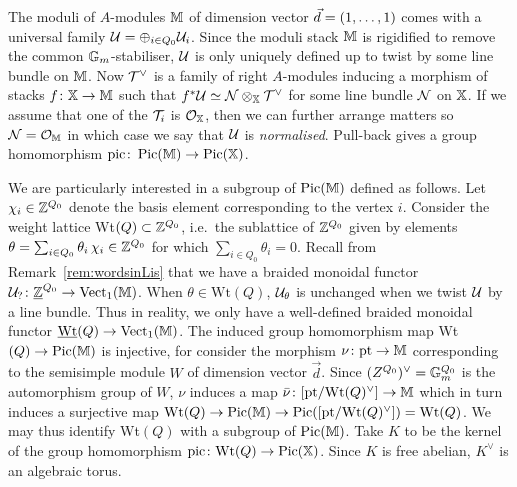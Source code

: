\documentclass[12pt]{amsart}
\begin{document}
The moduli of $A$-modules $\mathbb{M}$ of dimension vector ${\vec{d}} = (1, \ldots, 1)$ comes with a universal family $\mathcal{U}  = \oplus_{i \in Q_0} \mathcal{U}_i$. Since the moduli stack $\mathbb{M}$ is rigidified to remove the common $\mathbb{G}_m$-stabiliser, $\mathcal{U}$ is only uniquely defined up to twist by some line bundle on $\mathbb{M}$. 
Now $\mathcal{T}^{\vee}$ is a family of right $A$-modules inducing a morphism of stacks $f \colon \mathbb{X} \rightarrow \mathbb{M}$ such that $f^* \mathcal{U} \simeq \mathcal{N} \otimes_{\mathbb{X}} \mathcal{T}^{\vee}$ for some line bundle $\mathcal{N}$ on $\mathbb{X}$. If we assume that one of the $\mathcal{T}_i$ is $\mathcal{O}_{\mathbb{X}}$, then we can further arrange matters so $\mathcal{N} = \mathcal{O}_{\mathbb{M}}$ in which case we say that $\mathcal{U}$ is {\em normalised}. Pull-back gives a group homomorphism $\text{pic} \colon \operatorname{Pic}(\mathbb{M}) \rightarrow \operatorname{Pic}(\mathbb{X})$. 




We are particularly interested in a subgroup of $\operatorname{Pic}(\mathbb{M})$ defined as follows. Let $\chi_i \in \mathbb{Z}^{Q_0}$ denote the basis element corresponding to the vertex $i$. Consider the weight lattice Wt$(Q) \subset \mathbb{Z}^{Q_0}$, i.e.\ the sublattice of $\mathbb{Z}^{Q_0}$ given by elements $\theta = \sum_{i\in Q_0} \theta_i \,\chi_i \in \mathbb{Z}^{Q_0}$ for which $\sum_{i \in Q_0} \theta_i = 0$. Recall from Remark~\ref{rem:wordsinLis} that we have a braided monoidal functor  $\mathcal{U}_? \colon  \underline{\mathbb{Z}}^{Q_0} \to \operatorname{Vect}_1(\mathbb{M})$. When $\theta \in \text{Wt}(Q)$, $\mathcal{U}_{\theta}$ is  unchanged when we twist $\mathcal{U}$ by a line bundle. Thus in reality, we only have a well-defined braided monoidal functor $\underline{\text{Wt}}(Q) \to \operatorname{Vect}_1(\mathbb{M})$. 
The induced group homomorphism map Wt$(Q) \to \operatorname{Pic}(\mathbb{M})$ is injective, for consider the morphism $\nu \colon \text{pt} \rightarrow \mathbb{M}$ corresponding to the semisimple module $W$ of dimension vector $\vec{d}$. Since $(Z^{Q_0})^{\vee} = \mathbb{G}_m^{Q_0}$ is the automorphism group of $W$, $\nu$ induces a map $\bar{\nu} \colon [\text{pt}/\text{Wt}(Q)^{\vee}] \rightarrow \mathbb{M}$ which in turn induces a surjective map $\text{Wt}(Q) \rightarrow \operatorname{Pic}(\mathbb{M}) \rightarrow \operatorname{Pic} ([\text{pt}/\text{Wt}(Q)^{\vee}]) = \text{Wt}(Q)$. We may thus identify Wt$(Q)$ with a subgroup of $\operatorname{Pic}(\mathbb{M})$. Take $K$ to be the kernel of the group homomorphism $\text{pic} \colon \text{Wt}(Q) \rightarrow \operatorname{Pic}(\mathbb{X})$. Since $K$ is free abelian, $K^{\vee}$ is an algebraic torus. 
\end{document}

